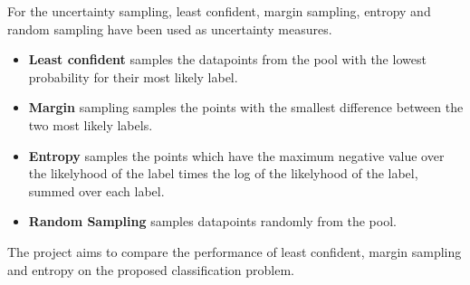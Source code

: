 \documentclass[12pt,fleqn]{article}
\begin{document}
\begin{multicols}{2}
		For the uncertainty sampling, least confident, margin sampling, entropy and random sampling have been used as uncertainty measures.
		
		\begin{itemize}
			\item \textbf{Least confident} samples the datapoints from the pool with the lowest probability for their most likely label.
			\item \textbf{Margin} sampling samples the points with the smallest difference between the two most likely labels.
			\item \textbf{Entropy} samples the points which have the maximum negative value over the likelyhood of the label times the log of the likelyhood of the label, summed over each label.
			\item \textbf{Random Sampling} samples datapoints randomly from the pool.
		\end{itemize}
		 
		The project aims to compare the performance of least confident, margin sampling and entropy on the proposed classification problem. 
		 
	\end{multicols}		
\end{document}
